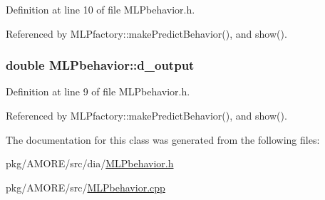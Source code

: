 Definition at line 10 of file MLPbehavior.h.



Referenced by MLPfactory::makePredictBehavior(), and show().

\hypertarget{class_m_l_pbehavior_a1a2045f66e72cd110227735ac0930900}{
\subsubsection[{d\_\-output}]{\setlength{\rightskip}{0pt plus 5cm}double {\bf MLPbehavior::d\_\-output}}}
\label{class_m_l_pbehavior_a1a2045f66e72cd110227735ac0930900}


Definition at line 9 of file MLPbehavior.h.



Referenced by MLPfactory::makePredictBehavior(), and show().



The documentation for this class was generated from the following files:\begin{DoxyCompactItemize}
\item 
pkg/AMORE/src/dia/\hyperlink{_m_l_pbehavior_8h}{MLPbehavior.h}\item 
pkg/AMORE/src/\hyperlink{_m_l_pbehavior_8cpp}{MLPbehavior.cpp}\end{DoxyCompactItemize}
